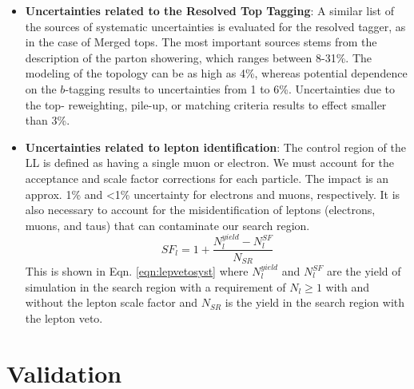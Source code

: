 \begin{itemize}
	\item \textbf{Uncertainties related to the Resolved Top Tagging}: A similar list of the sources of systematic uncertainties is evaluated for the resolved tagger, as in the case of Merged tops. The most important sources stems from the description of the parton showering, which ranges between 8-31\%. The modeling of the \ttbar{} topology can be as high as 4\%, whereas potential dependence on the $b$-tagging results to uncertainties from 1 to 6\%. Uncertainties due to the top-\pt{} reweighting, pile-up, or matching criteria results to effect smaller than 3\%. 
	\item \textbf{Uncertainties related to lepton identification}: The control region of the LL is defined as having a single muon or electron. We must account for the acceptance and scale factor corrections for each particle. The impact is an approx. 1\%  and <1\% uncertainty for electrons and muons, respectively. It is also necessary to account for the misidentification of leptons (electrons, muons, and taus) that can contaminate our search region. 
	\begin{equation}\label{eqn:lepvetosyst}
		SF_{l}=1+\frac{N_l^{yield}-N_l^{SF}}{N_{SR}}
	\end{equation}
	This is shown in Eqn. \ref{eqn:lepvetosyst} where $N_l^{yield}$ and $N_l^{SF}$ are  the yield of simulation in the search region with a requirement of $N_l\geq1$ with and without the lepton scale factor and $N_{SR}$ is the yield in the search region with the lepton veto.  
\end{itemize}

\section{Validation}\label{sec:Validation}



